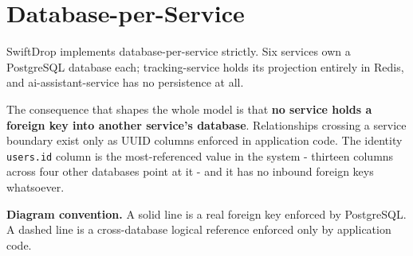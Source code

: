 \documentclass[11pt,a4paper,oneside,openany]{report}
\newcommand{\code}[1]{\texttt{\small #1}}
\begin{document}
\section{Database-per-Service}
SwiftDrop implements database-per-service strictly. Six services own a PostgreSQL database each;
tracking-service holds its projection entirely in Redis, and ai-assistant-service has no
persistence at all.

The consequence that shapes the whole model is that \textbf{no service holds a foreign key into
another service's database}. Relationships crossing a service boundary exist only as UUID columns
enforced in application code. The identity \code{users.id} column is the most-referenced value in
the system - thirteen columns across four other databases point at it - and it has no inbound
foreign keys whatsoever.

\begin{factbox}
\textbf{Diagram convention.} A solid line is a real foreign key enforced by PostgreSQL. A dashed
line is a cross-database logical reference enforced only by application code.
\end{factbox}
\end{document}
